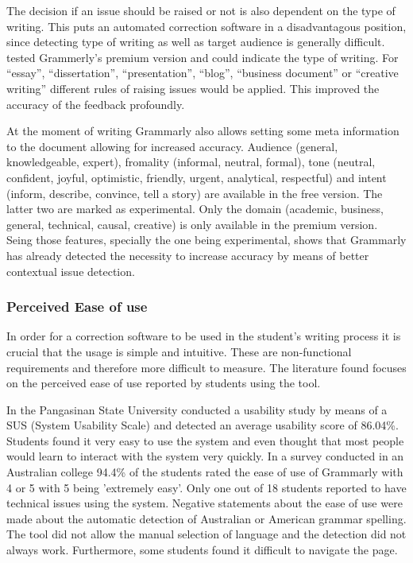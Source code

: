 \documentclass[runningheads]{llncs}
\begin{document}
The decision if an issue should be raised or not is also dependent on the type of writing. This puts an automated correction software in a disadvantagous position, since detecting type of writing as well as target audience is generally difficult. \textcite{cavaleri_you_2016} tested Grammerly's premium version and could indicate the type of writing. For ``essay'', ``dissertation'', ``presentation'', ``blog'', ``business document'' or ``creative writing'' different rules of raising issues would be applied. This improved the accuracy of the feedback profoundly.

At the moment of writing Grammarly also allows setting some meta information to the document allowing for increased accuracy. Audience (general, knowledgeable, expert), fromality (informal, neutral, formal), tone (neutral, confident, joyful, optimistic, friendly, urgent, analytical, respectful) and intent (inform, describe, convince, tell a story) are available in the free version. The latter two are marked as experimental. Only the domain (academic, business, general, technical, causal, creative) is only available in the premium version. Seing those features, specially the one being experimental, shows that Grammarly has already detected the necessity to increase accuracy by means of better contextual issue detection.

\subsubsection{Perceived Ease of use}
In order for a correction software to be used in the student's writing process it is crucial that the usage is simple and intuitive. These are non-functional requirements and therefore more difficult to measure. The literature found focuses on the perceived ease of use reported by students using the tool.

In the Pangasinan State University \textcite{ventayen_graduate_2018} conducted a usability study by means of a SUS (System Usability Scale) and detected an average usability score of 86.04\%. Students found it very easy to use the system and even thought that most people would learn to interact with the system very quickly. In a survey \citep{cavaleri_you_2016} conducted in an Australian college 94.4\% of the students rated the ease of use of Grammarly with 4 or 5 with 5 being 'extremely easy'. Only one out of 18 students reported to have technical issues using the system. Negative statements about the ease of use were made about the automatic detection of Australian or American grammar spelling. The tool did not allow the manual selection of language and the detection did not always work. Furthermore, some students found it difficult to navigate the page.
\end{document}
